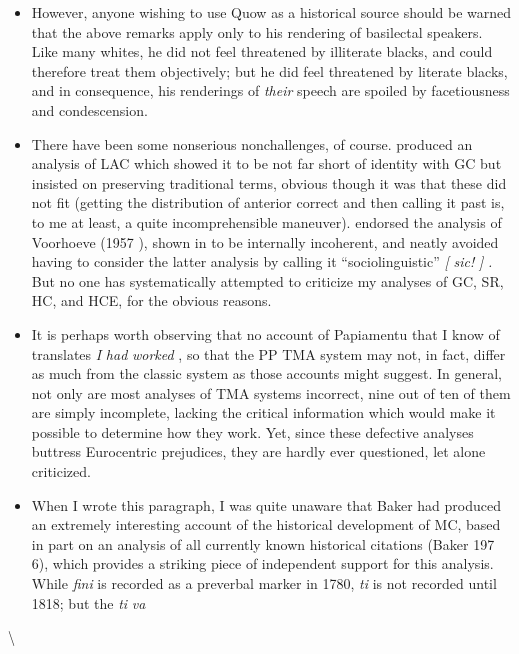 \begin{itemize}
\item However, anyone wishing to use Quow as a historical source should be warned that the above remarks apply only to his rendering of basilectal speakers. Like many whites, he did not feel threatened by illiterate blacks, and could therefore treat them objectively; but he did feel threatened by literate blacks, and in consequence, his ren\-derings of \textit{their} speech are spoiled by facetiousness and condescension.
\item There have been some nonserious nonchallenges, of course. \citet{Christie1976} produced an analysis of LAC which showed it to be not far short of identity with GC but insisted on preserving traditional terms, obvious though it was that these did not fit (getting the distri\-bution of anterior correct and then calling it past is, to me at least, a quite incomprehensible maneuver). \citet{Seuren1980} endorsed the analysis of Voorhoeve (1957 ), shown in \citet{Bickerton1975} to be intern\-ally incoherent, and neatly avoided having to consider the latter analy\-sis by calling it ``sociolinguistic'' \textit{[} \textit{sic!} \textit{]} \textit{.} But no one has systematically attempted to criticize my analyses of GC, SR, HC, and HCE, for the obvious reasons.
\item It is perhaps worth observing that no account of Papiamentu that I know of translates \textit{I} \textit{had} \textit{worked} , so that the PP TMA system may not, in fact, differ as much from the classic system as those ac\-counts might suggest. In general, not only are most analyses of TMA systems incorrect, nine out of ten of them are simply incomplete, lacking the critical information which would make it possible to deter\-mine how they work. Yet, since these defective analyses buttress Euro\-centric prejudices, they are hardly ever questioned, let alone criticized.
\item When I wrote this paragraph, I was quite unaware that Baker had produced an extremely interesting account of the historical de\-velopment of MC, based in part on an analysis of all currently known historical citations (Baker 197 6), which provides a striking piece of independent support for this analysis. While \textit{fini} is recorded as a pre\-verbal marker in 1780, \textit{ti }is not recorded until 1818; but the \textit{ti} \textit{va}
\end{itemize}

{\textbackslash}

